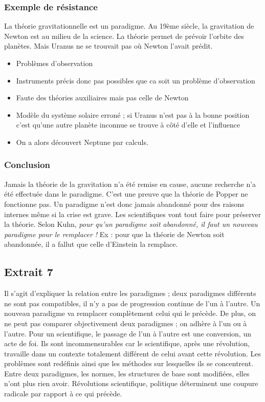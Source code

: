 \documentclass[11pt,a4paper]{article} %
\begin{document}
\subsubsection{Exemple de résistance}
La théorie gravitationnelle est un paradigme.
Au 19ème siècle, la gravitation de Newton est au milieu de la science.
La théorie permet de prévoir l'orbite des planètes.
Mais Uranus ne se trouvait pas où Newton l'avait prédit.
\begin{itemize}
	\item Problèmes d'observation
	\item Instruments précis donc pas possibles que ca soit un problème d'observation
	\item Faute des théories auxiliaires mais pas celle de Newton
	\item Modèle du système solaire erroné ; si Uranus n'est pas à la bonne position c'est qu'une autre planète inconnue se trouve à côté d'elle et l'influence
	\item On a alors découvert Neptune par calculs.
\end{itemize}
\subsubsection{Conclusion}
Jamais la théorie de la gravitation n'a été remise en cause, aucune recherche n'a été effectuée dans le paradigme.
C'est une preuve que la théorie de Popper ne fonctionne pas.
Un paradigme n'est donc jamais abandonné pour des raisons internes même si la crise est grave.
Les scientifiques vont tout faire pour préserver la théorie.
Selon Kuhn, \emph{pour qu'un paradigme soit abandonné, il faut un nouveau paradigme pour le remplacer !} Ex : pour que la théorie de Newton soit abandonnée, il a fallut que celle d'Einstein la remplace.
\subsection{Extrait 7}Il s'agit d'expliquer la relation entre les paradigmes ; deux paradigmes différents ne sont pas compatibles, il n'y a pas de progression continue de l'un à l'autre.
Un nouveau paradigme va remplacer complètement celui qui le précède.
De plus, on ne peut pas comparer objectivement deux paradigmes ; on adhère à l'un ou à l'autre.
Pour un scientifique, le passage de l'un à l'autre est une conversion, un acte de foi.
Ils sont incommensurables car le scientifique, après une révolution, travaille dans un contexte totalement différent de celui avant cette révolution.
Les problèmes sont redéfinis ainsi que les méthodes sur lesquelles ils se concentrent.
Entre deux paradigmes, les normes, les structures de base sont modifiées, elles n'ont plus rien avoir.
Révolutions scientifique, politique déterminent une coupure radicale par rapport à ce qui précède.
\end{document}
